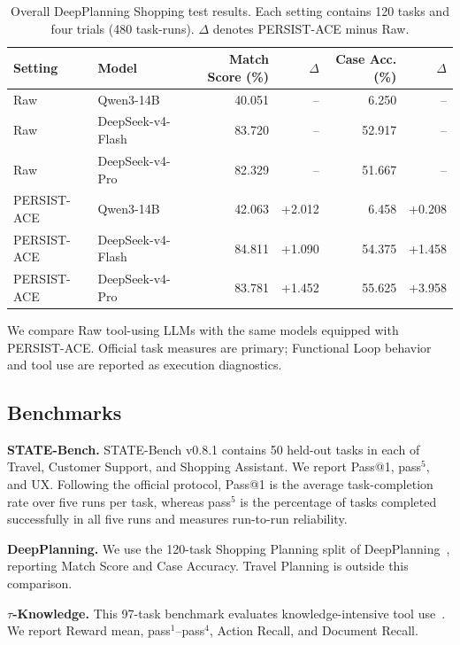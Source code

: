 \begin{table}[!t]
\centering
\small
\setlength{\tabcolsep}{3pt}
\renewcommand{\arraystretch}{0.95}
\begin{tabular*}{\textwidth}{@{\extracolsep{\fill}}llrrrr@{}}
\toprule
Setting & Model & Match Score (\%) & $\Delta$ & Case Acc. (\%) & $\Delta$ \\
\midrule
Raw & Qwen3-14B & 40.051 & -- & 6.250 & -- \\
Raw & DeepSeek-v4-Flash & 83.720 & -- & 52.917 & -- \\
Raw & DeepSeek-v4-Pro & 82.329 & -- & 51.667 & -- \\
PERSIST-ACE & Qwen3-14B & 42.063 & +2.012 & 6.458 & +0.208 \\
PERSIST-ACE & DeepSeek-v4-Flash & 84.811 & +1.090 & 54.375 & +1.458 \\
PERSIST-ACE & DeepSeek-v4-Pro & 83.781 & +1.452 & 55.625 & +3.958 \\
\bottomrule
\end{tabular*}
\renewcommand{\arraystretch}{1.0}
\caption{Overall DeepPlanning Shopping test results. Each setting contains
120 tasks and four trials (480 task-runs). $\Delta$ denotes PERSIST-ACE minus
Raw.}
\label{tab:deepplanning-main}
\end{table}

We compare Raw tool-using LLMs with the same models equipped with PERSIST-ACE. Official
task measures are primary; Functional Loop behavior and tool use are reported as execution
diagnostics.

\subsection*{Benchmarks}

\textbf{STATE-Bench.} STATE-Bench v0.8.1 contains 50 held-out tasks in each of
Travel, Customer Support, and Shopping Assistant. We report Pass@1,
pass$^5$, and UX. Following the official protocol, Pass@1 is the average
task-completion rate over five runs per task, whereas pass$^5$ is the percentage
of tasks completed successfully in all five runs and measures run-to-run
reliability.

\textbf{DeepPlanning.} We use the 120-task Shopping Planning split of
DeepPlanning~\citep{zhang2026deepplanning}, reporting Match Score and Case
Accuracy. Travel Planning is outside this comparison.

\textbf{$\tau$-Knowledge.} This 97-task benchmark evaluates knowledge-intensive
tool use~\citep{shi2026tauknowledge}. We report Reward mean, pass$^1$--pass$^4$,
Action Recall, and Document Recall.

